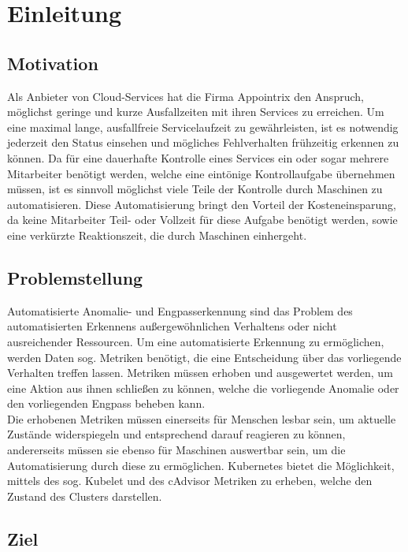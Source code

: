 \documentclass[a4paper,12pt]{scrartcl}
\title{}
\author{Johannes Bohlig}
\date{\today}
\begin{document}
\tableofcontents

\pagebreak

\section{Einleitung}
\subsection{Motivation}

Als Anbieter von Cloud-Services hat die Firma Appointrix den Anspruch, möglichst geringe und kurze Ausfallzeiten mit ihren Services zu erreichen. Um eine maximal lange, ausfallfreie Servicelaufzeit zu gewährleisten, ist es notwendig jederzeit den Status einsehen und mögliches Fehlverhalten frühzeitig erkennen zu können. 
Da für eine dauerhafte Kontrolle eines Services ein oder sogar mehrere Mitarbeiter benötigt werden, welche eine eintönige Kontrollaufgabe übernehmen müssen, ist es sinnvoll möglichst viele Teile der Kontrolle durch Maschinen zu automatisieren. Diese Automatisierung bringt den Vorteil der Kosteneinsparung, da keine Mitarbeiter Teil- oder Vollzeit für diese Aufgabe benötigt werden, sowie eine verkürzte Reaktionszeit, die durch Maschinen einhergeht.

\subsection{Problemstellung}

Automatisierte Anomalie- und Engpasserkennung sind das Problem des automatisierten Erkennens außergewöhnlichen Verhaltens oder nicht ausreichender Ressourcen. Um eine automatisierte Erkennung zu ermöglichen, werden Daten sog. Metriken benötigt, die eine Entscheidung über das vorliegende Verhalten treffen lassen. Metriken müssen erhoben und ausgewertet werden, um eine Aktion aus ihnen schließen zu können, welche die vorliegende Anomalie oder den vorliegenden Engpass beheben kann.\\
Die erhobenen Metriken müssen einerseits für Menschen lesbar sein, um aktuelle Zustände widerspiegeln und entsprechend darauf reagieren zu können, andererseits müssen sie ebenso für Maschinen auswertbar sein, um die Automatisierung durch diese zu ermöglichen.
Kubernetes bietet die Möglichkeit, mittels des sog. Kubelet und des cAdvisor Metriken zu erheben, welche den Zustand des Clusters darstellen. 

\subsection{Ziel}
\end{document}
